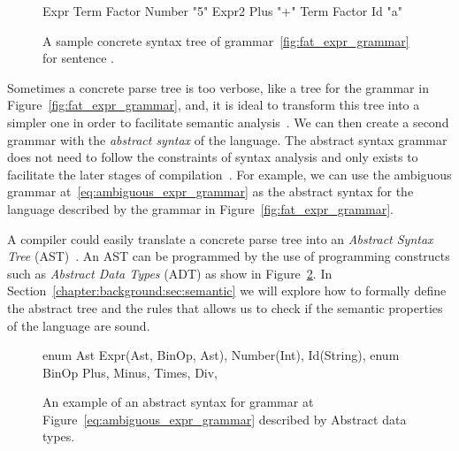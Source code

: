 \documentclass[
  oneside,
  english,
  coorientadorbanca,
  noabntexcite
]{ufsc-thesis-rn46-2019}
\newcommand{\codett}[1]{\text{\scpfamily#1}}
\begin{document}
\begin{figure}[ht]
  \centering
  \begin{minipage}{0.5\textwidth}
    \begin{rustcode}
Expr
  Term
    Factor
      Number "5"
  Expr2
    Plus "+"
    Term
      Factor
        Id "a"
    \end{rustcode}
  \end{minipage}
  \caption{
    A sample concrete syntax tree of grammar~\ref{fig:fat_expr_grammar} for sentence \codett{5 + a}.
  }\label{fig:concrete_syntax_tree}
\end{figure}

Sometimes a concrete parse tree is too verbose, like a tree for the grammar in Figure~\ref{fig:fat_expr_grammar}, and, it is ideal to transform this tree into a simpler one in order to facilitate semantic analysis~\cite{appel2003modern}.
We can then create a second grammar with the \textit{abstract syntax} of the language.
The abstract syntax grammar does not need to follow the constraints of syntax analysis and only exists to facilitate the later stages of compilation~\cite{appel2003modern}.
For example, we can use the ambiguous grammar at~\eqref{eq:ambiguous_expr_grammar} as the abstract syntax for the language described by the grammar in Figure~\ref{fig:fat_expr_grammar}.

A compiler could easily translate a concrete parse tree into an \textit{Abstract Syntax Tree} (AST)~\cite{appel2003modern}.
An AST can be programmed by the use of programming constructs such as \textit{Abstract Data Types} (ADT) as show in Figure~\ref{fig:abstract_syntax_adt}.
In Section~\ref{chapter:background:sec:semantic} we will explore how to formally define the abstract tree and the rules that allows us to check if the semantic properties of the language are sound.

\begin{figure}[ht]
  \centering
  \begin{minipage}{0.6\textwidth}
    \begin{rustcode}
enum Ast {
  Expr(Ast, BinOp, Ast),
  Number(Int),
  Id(String),
}
enum BinOp {
  Plus,
  Minus,
  Times,
  Div,
}
    \end{rustcode}
  \end{minipage}
  \caption{
    An example of an abstract syntax for grammar at Figure~\eqref{eq:ambiguous_expr_grammar} described by Abstract data types.
  }\label{fig:abstract_syntax_adt}
\end{figure}
\end{document}
